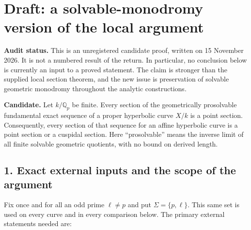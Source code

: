 \section*{Draft: a solvable-monodromy version of the local argument}

\noindent\textbf{Audit status.}
This is an unregistered candidate proof, written on 15 November 2026.
It is not a numbered result of the return.  In particular, no conclusion
below is currently an input to a proved statement.  The claim is stronger
than the supplied local section theorem, and the new issue is preservation
of solvable geometric monodromy throughout the analytic constructions.

\medskip
\noindent\textbf{Candidate.}
Let $k/\mathbb Q_p$ be finite.  Every section of the geometrically
prosolvable fundamental exact sequence of a proper hyperbolic curve
$X/k$ is a point section.  Consequently, every section of that sequence
for an affine hyperbolic curve is a point section or a cuspidal section.
Here ``prosolvable'' means the inverse limit of all finite solvable
geometric quotients, with no bound on derived length.

\subsection*{1. Exact external inputs and the scope of the argument}

Fix once and for all an odd prime $\ell\ne p$ and put
$\Sigma=\{p,\ell\}$.  This same set is used on every curve and in every
comparison below.  The primary external statements needed are:

